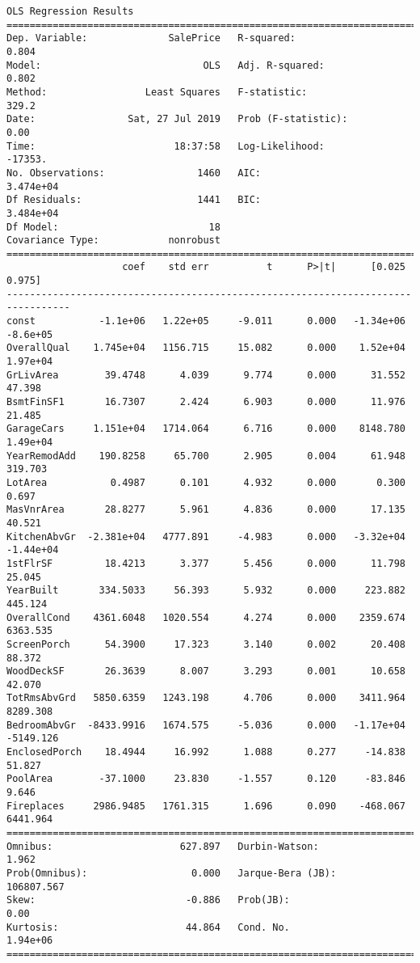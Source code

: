 \documentclass[11pt]{article}
\begin{document}
    \begin{Verbatim}[commandchars=\\\{\}]
                            OLS Regression Results                            
==============================================================================
Dep. Variable:              SalePrice   R-squared:                       0.804
Model:                            OLS   Adj. R-squared:                  0.802
Method:                 Least Squares   F-statistic:                     329.2
Date:                Sat, 27 Jul 2019   Prob (F-statistic):               0.00
Time:                        18:37:58   Log-Likelihood:                -17353.
No. Observations:                1460   AIC:                         3.474e+04
Df Residuals:                    1441   BIC:                         3.484e+04
Df Model:                          18                                         
Covariance Type:            nonrobust                                         
=================================================================================
                    coef    std err          t      P>|t|      [0.025      0.975]
---------------------------------------------------------------------------------
const           -1.1e+06   1.22e+05     -9.011      0.000   -1.34e+06    -8.6e+05
OverallQual    1.745e+04   1156.715     15.082      0.000    1.52e+04    1.97e+04
GrLivArea        39.4748      4.039      9.774      0.000      31.552      47.398
BsmtFinSF1       16.7307      2.424      6.903      0.000      11.976      21.485
GarageCars     1.151e+04   1714.064      6.716      0.000    8148.780    1.49e+04
YearRemodAdd    190.8258     65.700      2.905      0.004      61.948     319.703
LotArea           0.4987      0.101      4.932      0.000       0.300       0.697
MasVnrArea       28.8277      5.961      4.836      0.000      17.135      40.521
KitchenAbvGr  -2.381e+04   4777.891     -4.983      0.000   -3.32e+04   -1.44e+04
1stFlrSF         18.4213      3.377      5.456      0.000      11.798      25.045
YearBuilt       334.5033     56.393      5.932      0.000     223.882     445.124
OverallCond    4361.6048   1020.554      4.274      0.000    2359.674    6363.535
ScreenPorch      54.3900     17.323      3.140      0.002      20.408      88.372
WoodDeckSF       26.3639      8.007      3.293      0.001      10.658      42.070
TotRmsAbvGrd   5850.6359   1243.198      4.706      0.000    3411.964    8289.308
BedroomAbvGr  -8433.9916   1674.575     -5.036      0.000   -1.17e+04   -5149.126
EnclosedPorch    18.4944     16.992      1.088      0.277     -14.838      51.827
PoolArea        -37.1000     23.830     -1.557      0.120     -83.846       9.646
Fireplaces     2986.9485   1761.315      1.696      0.090    -468.067    6441.964
==============================================================================
Omnibus:                      627.897   Durbin-Watson:                   1.962
Prob(Omnibus):                  0.000   Jarque-Bera (JB):           106807.567
Skew:                          -0.886   Prob(JB):                         0.00
Kurtosis:                      44.864   Cond. No.                     1.94e+06
==============================================================================


\end{Verbatim}
\end{document}
